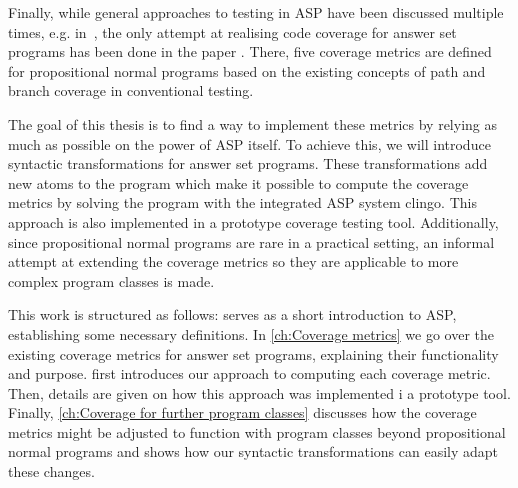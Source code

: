 Finally, while general approaches to testing in ASP have been discussed multiple times, e.g. in~\cite{GOT17, ABR21, Oet22}, the only attempt at realising code coverage for answer set programs has been done in the paper \cite{Jan+10}. 
There, five coverage metrics are defined for propositional normal programs based on the existing concepts of path and branch coverage in conventional testing. 

The goal of this thesis is to find a way to implement these metrics by relying as much as possible on the power of ASP itself. To achieve this, we will introduce syntactic transformations for answer set programs. These transformations add new atoms to the program which make it possible to compute the coverage metrics by solving the program with the integrated ASP system clingo. This approach is also implemented in a prototype coverage testing tool. Additionally, since propositional normal programs are rare in a practical setting, an informal attempt at extending the coverage metrics so they are applicable to more complex program classes is made.

This work is structured as follows:  serves as a short introduction to ASP, establishing some necessary definitions. In \cref{ch:Coverage metrics} we go over the existing coverage metrics for answer set programs, explaining their functionality and purpose.  first introduces our approach to computing each coverage metric. Then, details are given on how this approach was implemented i a prototype tool. Finally, \cref{ch:Coverage for further program classes} discusses how the coverage metrics might be adjusted to function with program classes beyond propositional normal programs and shows how our syntactic transformations can easily adapt these changes.

\begin{comment}
- Answer Set Programming is of growing importance in both academic and industry work (source?) and clingo is a popular solver for this

- Workflow Tools that make working with such programs easier and more comfortable barely exist. Research into these topics is only 
now getting more traction (source?)

- Testing is a very important part of a conventional software design approach.(source?)

- The topic of code coverage and it's use for conventional programming languages has been shown (source?)

- With this work I want to build on the previous work done on code coverage in answer set programming in this paper by~\textcite{Jan+10}

- To this end I developed a way to efficiently implement the coverage metrics defined in the paper.

- My implementation allows me to compute coverage using answer set programming. It also extends the given metrics to function with
almost all existing language construct instead of just for propositional programs.
\end{comment}

